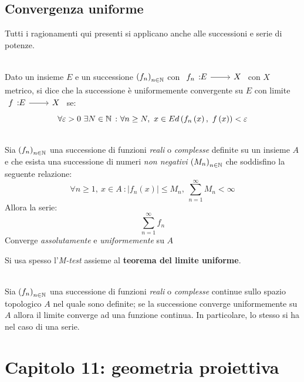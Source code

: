 \subsection{Convergenza uniforme}\label{convergenzauniforme}
Tutti i ragionamenti qui presenti si applicano anche alle successioni e serie di potenze.
\begin{define}~{}\\
	Dato un insieme $E$ e un successione $\left(f_n\right)_{n\in\mathbb{N}}$ con $\funz{f_n}{E}{X}$ con $X$ metrico, si dice che la successione è uniformemente convergente  su $E$ con limite $\funz{f}{E}{X}$ se:
	\begin{equation}
		\forall\epsilon>0\ \exists N\in\naturalset\ \colon \forall n\geq N,\ x\in E \mvf{d}{f_n\left(x\right)}{f\left(x\right)}<\epsilon
	\end{equation}
\vspace{-6mm}
\end{define}
\begin{theorema}~{}\\
	Sia $\left(f_n\right)_{n\in\mathbb{N}}$ una successione di funzioni \textit{reali} o \textit{complesse} definite su un insieme $A$ e che esista una successione di numeri \textit{non negativi} $\left(M_n\right)_{n\in\mathbb{N}}$ che soddisfino la seguente relazione:
	\begin{equation}
		\forall n\geq 1,\ x\in A\ \colon \lvert f_n\left(x\right)\rvert \leq M_n,\ \sum_{n=1}^{\infty}M_n<\infty
	\end{equation}
Allora la serie:
\begin{equation}
	\sum_{n=1}^{\infty}f_n
\end{equation}
Converge \textit{assolutamente} e \textit{uniformemente} su $A$
\end{theorema}
Si usa spesso l'\textit{M-test} assieme al \textbf{teorema del limite uniforme}.
\begin{theorema}~{}\\
Sia $\left(f_n\right)_{n\in\mathbb{N}}$ una successione di funzioni \textit{reali} o \textit{complesse} continue sullo spazio topologico $A$ nel quale sono definite; se la successione converge uniformemente su $A$ allora il limite converge ad una funzione continua. In particolare, lo stesso si ha nel caso di una serie.
\end{theorema}
\section{Capitolo 11: geometria proiettiva}
